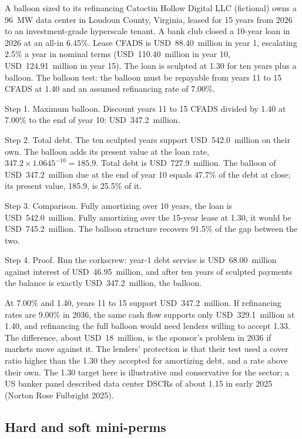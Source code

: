 \begin{example}{A balloon sized to its refinancing \illustrative}\label{ex:36.9}
Catoctin Hollow Digital LLC (fictional) owns a 96~MW data center in Loudoun County, Virginia, leased for 15 years from 2026 to an investment-grade hyperscale tenant. A bank club closed a 10-year loan in 2026 at an all-in 6.45\%. Lease CFADS is USD~88.40~million in year 1, escalating 2.5\% a year in nominal terms (USD~110.40~million in year 10, USD~124.91~million in year 15). The loan is sculpted at 1.30\x{} for ten years plus a balloon. The balloon test: the balloon must be repayable from years 11 to 15 CFADS at 1.40\x{} and an assumed refinancing rate of 7.00\%.

Step 1. Maximum balloon. Discount years 11 to 15 CFADS divided by 1.40 at 7.00\% to the end of year 10: USD~347.2~million.

Step 2. Total debt. The ten sculpted years support USD~542.0~million on their own. The balloon adds its present value at the loan rate, $347.2 \times 1.0645^{-10} = 185.9$. Total debt is USD~727.9~million. The balloon of USD~347.2~million due at the end of year 10 equals 47.7\% of the debt at close; its present value, 185.9, is 25.5\% of it.

Step 3. Comparison. Fully amortizing over 10 years, the loan is USD~542.0~million. Fully amortizing over the 15-year lease at 1.30\x, it would be USD~745.2~million. The balloon structure recovers 91.5\% of the gap between the two.

Step 4. Proof. Run the corkscrew: year-1 debt service is USD~68.00~million against interest of USD~46.95~million, and after ten years of sculpted payments the balance is exactly USD~347.2~million, the balloon.
\end{example}

At 7.00\% and 1.40\x, years 11 to 15 support USD~347.2~million. If refinancing rates are 9.00\% in 2036, the same cash flow supports only USD~329.1~million at 1.40\x, and refinancing the full balloon would need lenders willing to accept 1.33\x. The difference, about USD~18~million, is the sponsor's problem in 2036 if markets move against it. The lenders' protection is that their test used a cover ratio higher than the 1.30\x{} they accepted for amortizing debt, and a rate above their own. The 1.30\x{} target here is illustrative and conservative for the sector; a US banker panel described data center DSCRs of about 1.15\x{} in early 2025 (Norton Rose Fulbright 2025).

\subsection{Hard and soft mini-perms}\label{ssec:36.7.2}

